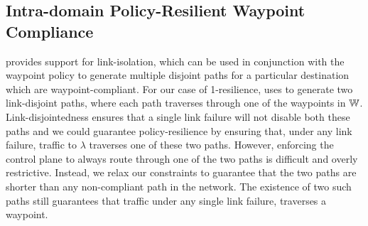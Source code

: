 %









\subsection{Intra-domain Policy-Resilient Waypoint Compliance}\label{sec:ospfwaypoint}
\genesis provides support for link-isolation, which can be used 
in conjunction with the waypoint policy to generate multiple disjoint paths
for a particular destination which are waypoint-compliant. For our case of 1-resilience, 
\name uses \genesis to generate two link-disjoint paths, where each path traverses through
one of the waypoints in $\mathbb{W}$. Link-disjointedness ensures that
a single link
failure will not disable both these paths
and we could guarantee policy-resilience by 
ensuring that, under any link failure,
traffic to $\lambda$ 
traverses one of these two paths.
However, enforcing the control plane to 
always route through one of the 
two paths is difficult and overly 
restrictive. 
Instead, we relax our constraints to guarantee that
the two paths are shorter than any non-compliant path in 
the network. The existence of 
two such paths still guarantees that 
traffic under any single link failure, traverses a waypoint. 



